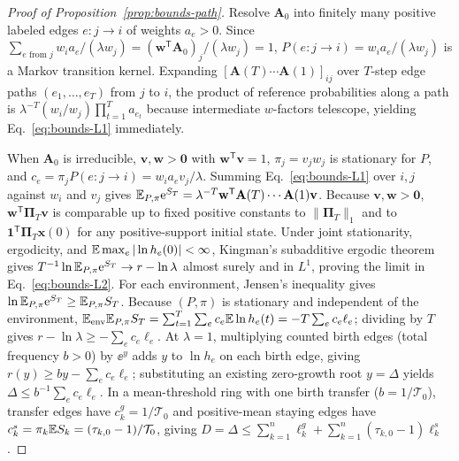 \begin{proof}[Proof of Proposition~{\upshape\ref{prop:bounds-path}}]
Resolve $\mathbf{A}_0$ into finitely many positive labeled edges $e: j \to i$ of weights $a_e > 0$. Since $\sum_{e \text{ from } j} w_i a_e / (\lambda w_j) = (\mathbf{w}^{\mathsf{T}}\mathbf{A}_0)_j / (\lambda w_j) = 1$, $P(e: j \to i) = w_i a_e / (\lambda w_j)$ is a Markov transition kernel. Expanding $[\mathbf{A}(T)\cdots\mathbf{A}(1)]_{ij}$ over $T$-step edge paths $(e_1, \dots, e_T)$ from $j$ to $i$, the product of reference probabilities along a path is $\lambda^{-T}(w_i / w_j)\prod_{t=1}^T a_{e_t}$ because intermediate $w$-factors telescope, yielding Eq.~\eqref{eq:bounds-L1} immediately.

When $\mathbf{A}_0$ is irreducible, $\mathbf{v}, \mathbf{w} > \mathbf{0}$ with $\mathbf{w}^{\mathsf{T}}\mathbf{v} = 1$, $\pi_j = v_j w_j$ is stationary for $P$, and $c_e = \pi_j P(e: j \to i) = w_i a_e v_j / \lambda$. Summing Eq.~\eqref{eq:bounds-L1} over $i, j$ against $w_i$ and $v_j$ gives $\mathbb{E}_{P,\pi}\mathrm{e}^{S_T} = \lambda^{-T}\mathbf{w}^{\mathsf{T}}\mathbf{A}(T)\cdots\mathbf{A}(1)\mathbf{v}$. Because $\mathbf{v}, \mathbf{w} > \mathbf{0}$, $\mathbf{w}^{\mathsf{T}}\boldsymbol{\Pi}_T\mathbf{v}$ is comparable up to fixed positive constants to $\|\boldsymbol{\Pi}_T\|_1$ and to $\mathbf{1}^{\mathsf{T}}\boldsymbol{\Pi}_T\mathbf{x}(0)$ for any positive-support initial state. Under joint stationarity, ergodicity, and $\mathbb{E}\max_e |\ln h_e(0)| < \infty$, Kingman's subadditive ergodic theorem gives $T^{-1}\ln\mathbb{E}_{P,\pi}\mathrm{e}^{S_T} \to r - \ln\lambda$ almost surely and in $L^1$, proving the limit in Eq.~\eqref{eq:bounds-L2}. For each environment, Jensen's inequality gives $\ln\mathbb{E}_{P,\pi}\mathrm{e}^{S_T} \ge \mathbb{E}_{P,\pi} S_T$. Because $(P, \pi)$ is stationary and independent of the environment, $\mathbb{E}_{\mathrm{env}}\mathbb{E}_{P,\pi} S_T = \sum_{t=1}^T \sum_e c_e \mathbb{E}\ln h_e(t) = -T\sum_e c_e \ell_e$; dividing by $T$ gives $r - \ln\lambda \ge -\sum_e c_e \ell_e$. At $\lambda = 1$, multiplying counted birth edges (total frequency $b > 0$) by $\ee^y$ adds $y$ to $\ln h_e$ on each birth edge, giving $r(y) \ge b y - \sum_e c_e \ell_e$; substituting an existing zero-growth root $y = \Delta$ yields $\Delta \le b^{-1}\sum_e c_e \ell_e$. In a mean-threshold ring with one birth transfer ($b = 1/\mathcal{T}_0$), transfer edges have $c_k^g = 1/\mathcal{T}_0$ and positive-mean staying edges have $c_k^s = \pi_k \mathbb{E} S_k = (\tau_{k,0} - 1)/\mathcal{T}_0$, giving $D = \Delta \le \sum_{k=1}^n \ell_k^g + \sum_{k=1}^n (\tau_{k,0} - 1)\ell_k^s$.
\end{proof}

